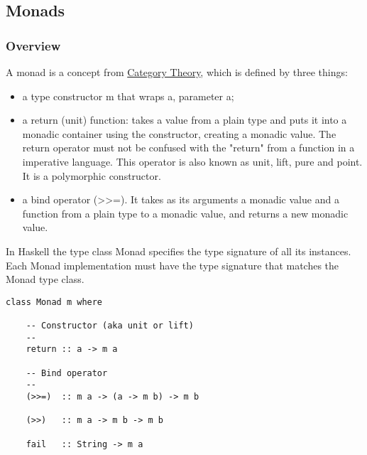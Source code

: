 \documentclass[11pt]{article}
\begin{document}
\subsection{Monads}
\label{sec-1-13}
\subsubsection{Overview}
\label{sec-1-13-1}

A monad is a concept from \uline{Category Theory}, which is defined by three
things:

\begin{itemize}
\item a type constructor m that wraps a, parameter a;

\item a return (unit) function: takes a value from a plain type and puts it
into a monadic container using the constructor, creating a monadic
value. The return operator must not be confused with the "return"
from a function in a imperative language. This operator is also
known as unit, lift, pure and point. It is a polymorphic
constructor.

\item a bind operator (>>=). It takes as its arguments a monadic value
and a function from a plain type to a monadic value, and returns a
new monadic value.
\end{itemize}

In Haskell the type class Monad specifies the type signature of all
its instances. Each Monad implementation must have the type signature
that matches the Monad type class. 


\begin{verbatim}
class Monad m where

    -- Constructor (aka unit or lift)
    -- 
    return :: a -> m a      

    -- Bind operator
    --
    (>>=)  :: m a -> (a -> m b) -> m b   

    (>>)   :: m a -> m b -> m b

    fail   :: String -> m a
\end{verbatim}
\end{document}
